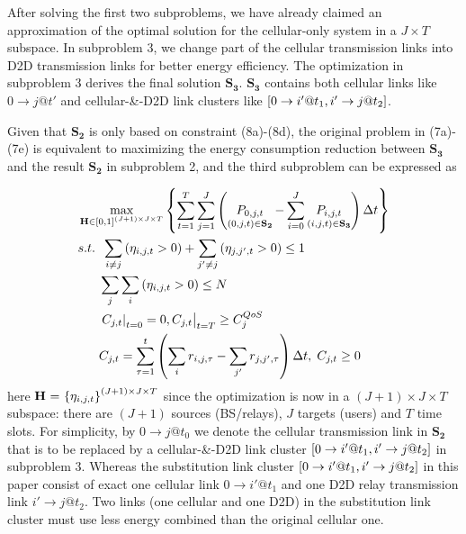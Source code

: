 \documentclass{ieeeaccess}
\begin{document}
After solving the first two subproblems, we have already claimed an approximation of the optimal solution for the cellular-only system in a $J \times T$ subspace. In subproblem 3, we change part of the cellular transmission links into D2D transmission links for better energy efficiency. The optimization in subproblem 3 derives the final solution ${{\mathbf{S}}_{\mathbf{3}}}$. ${{\mathbf{S}}_{\mathbf{3}}}$ contains both cellular links like $0 \to j@t'$ and cellular-\&-D2D link clusters like $\left[ {{\rm{0}} \to i'@{t_1},i' \to j@{t_2}} \right]$.

Given that ${{\mathbf{S}}_{\mathbf{2}}}$ is only based on constraint (8a)-(8d), the original problem in (7a)-(7e) is equivalent to maximizing the energy consumption reduction between ${{\mathbf{S}}_{\mathbf{3}}}$ and the result ${{\mathbf{S}}_{\mathbf{2}}}$ in subproblem 2, and the third subproblem can be expressed as

\begin{subequations}
\begin{align}
& \mathop {\max }\limits_{{\mathbf{{\rm H}}} \in {{\left[ {0,1} \right]}^{\left( {J + 1} \right) \times J \times T}}} \left\{ {\sum\limits_{t = 1}^T {\sum\limits_{j = 1}^J {\left( {\mathop {{P_{0,j,t}}}\limits_{\left( {0,j,t} \right) \in {{\mathbf{S}}_{\mathbf{2}}}}  - \sum\limits_{i = 0}^J {\mathop {{P_{i,j,t}}}\limits_{\left( {i,j,t} \right) \in {{\mathbf{S}}_{\mathbf{3}}}} } } \right)\Delta t} } } \right\} \\
& {s.t.} \;\; \sum\limits_{i \ne j} {\left( {{\eta _{i,j,t}} > 0} \right)}  + \sum\limits_{j' \ne j} {\left( {{\eta _{j,j',t}} > 0} \right) \le {\text{1}}} \\
& \;\;\;\;\;\; \sum\limits_j {\sum\limits_i {\left( {{\eta _{i,j,t}} > 0} \right)} }  \le N \\
& \;\;\;\;\;\; {\left. {{{\left. {{C_{j,t}}} \right|}_{t = 0}} = 0, {C_{j,t}}} \right|_{t = T}} \ge C_j^{QoS} \\
& \;\;\;\;\;\; {C_{j,t}} = \sum\limits_{\tau  = 1}^t {\left( {\sum\limits_i {{r_{i,j,\tau }}}  - \sum\limits_{j'} {{r_{j,j',\tau }}} } \right)\Delta t} ,\; {C_{j,t}} \ge 0
\end{align}
\end{subequations}
here ${\mathbf{{\rm H}}}{\text{ = }}{\left\{ {{\eta _{i,j,t}}} \right\}^{\left( {J + 1} \right) \times J \times T}}$ since the optimization is now in a $\left( {J + 1} \right) \times J \times T$ subspace: there are $\left( {J + 1} \right)$ sources (BS/relays), $J$ targets (users) and $T$ time slots. For simplicity, by $0 \to j@{t_0}$ we denote the cellular transmission link in ${{\mathbf{S}}_{\mathbf{2}}}$ that is to be replaced by a cellular-\&-D2D link cluster $\left[ {{\rm{0}} \to i'@{t_1},i' \to j@{t_2}} \right]$ in subproblem 3. Whereas the substitution link cluster $\left[ {{\rm{0}} \to i'@{t_1},i' \to j@{t_2}} \right]$ in this paper consist of exact one cellular link $0 \to i'@{t_1}$ and one D2D relay transmission link $i' \to j@{t_2}$. Two links (one cellular and one D2D) in the substitution link cluster must use less energy combined than the original cellular one.
\end{document}
